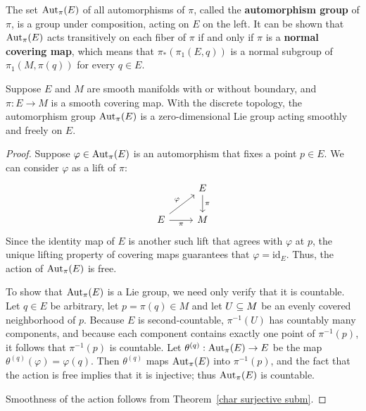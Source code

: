 The set $\mathrm{Aut}_\pi(E)$ of all automorphisms of $\pi$, called the \textbf{automorphism group} of $\pi$, is a group under composition, acting on $E$ on the left. It can be shown that $\mathrm{Aut}_\pi(E)$ acts transitively on each fiber of $\pi$ if and only if $\pi$ is a \textbf{normal covering map}, which means that $\pi_*(\pi_1(E,q))$ is a normal subgroup of $\pi_1(M,\pi(q))$ for every $q\in E$.
\begin{proposition}\label{Lie group coveing auto}
Suppose $E$ and $M$ are smooth manifolds with or without boundary, and $\pi:E\to M$ is a smooth covering map. With the discrete topology, the automorphism group $\mathrm{Aut}_\pi(E)$ is a zero-dimensional Lie group acting smoothly and freely on $E$.
\end{proposition}
\begin{proof}
Suppose $\varphi\in\mathrm{Aut}_\pi(E)$ is an automorphism that fixes a point $p\in E$. We can consider $\varphi$ as a lift of $\pi$:
\[\begin{tikzcd}
&E\ar[d,"\pi"]\\
E\ar[r,swap,"\pi"]\ar[ru,"\varphi"]&M
\end{tikzcd}\]
Since the identity map of $E$ is another such lift that agrees with $\varphi$ at $p$, the unique lifting property of covering maps guarantees that $\varphi=\mathrm{id}_E$. Thus, the action of $\mathrm{Aut}_\pi(E)$ is free.\par
To show that $\mathrm{Aut}_\pi(E)$ is a Lie group, we need only verify that it is countable. Let $q\in E$ be arbitrary, let $p=\pi(q)\in M$ and let $U\subseteq M$ be an evenly covered neighborhood of $p$. Because $E$ is second-countable, $\pi^{-1}(U)$ has countably many components, and because each component contains exactly one point of $\pi^{-1}(p)$, it follows that $\pi^{-1}(p)$ is countable. Let $\theta^{(q)}:\mathrm{Aut}_\pi(E)\to E$ be the map $\theta^{(q)}(\varphi)=\varphi(q)$. Then $\theta^{(q)}$ maps $\mathrm{Aut}_\pi(E)$ into $\pi^{-1}(p)$, and the fact that the action is free implies that it is injective; thus $\mathrm{Aut}_\pi(E)$ is countable.\par
Smoothness of the action follows from Theorem~\ref{char surjective subm}.
\end{proof}

